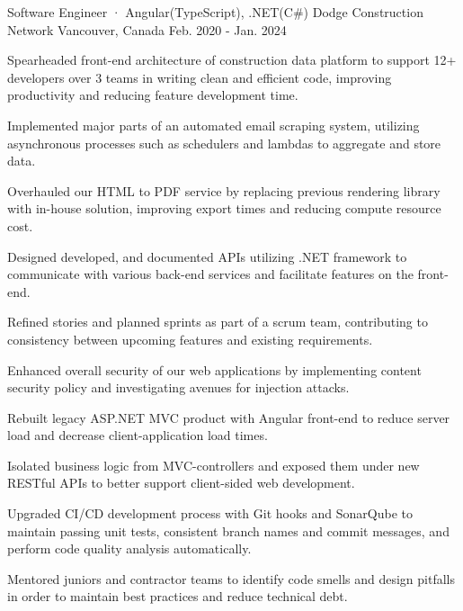 

\begin{cventries}

\cventry
  {Software Engineer · Angular(TypeScript), .NET(C\#)} %
  {Dodge Construction Network} %
  {Vancouver, Canada} %
  {Feb. 2020 - Jan. 2024} %
  {
    \begin{cvitems} %
      \item {Spearheaded front-end architecture of construction data platform to support 12+ developers over 3 teams in writing clean and efficient code, improving productivity and reducing feature development time.}
      \item {Implemented major parts of an automated email scraping system, utilizing asynchronous processes such as schedulers and lambdas to aggregate and store data.}
      \item {Overhauled our HTML to PDF service by replacing previous rendering library with in-house solution, improving export times and reducing compute resource cost.}
      \item {Designed developed, and documented APIs utilizing .NET framework to communicate with various back-end services and facilitate features on the front-end.}
      \item {Refined stories and planned sprints as part of a scrum team, contributing to consistency between upcoming features and existing requirements.}
      \item {Enhanced overall security of our web applications by implementing content security policy and investigating avenues for injection attacks.}
      \item {Rebuilt legacy ASP.NET MVC product with Angular front-end to reduce server load and decrease client-application load times.}
      \item {Isolated business logic from MVC-controllers and exposed them under new RESTful APIs to better support client-sided web development.}
      \item {Upgraded CI/CD development process with Git hooks and SonarQube to maintain passing unit tests, consistent branch names and commit messages, and perform code quality analysis automatically.}
      \item {Mentored juniors and contractor teams to identify code smells and design pitfalls in order to maintain best practices and reduce technical debt.}
    \end{cvitems}
  }


\end{cventries}
